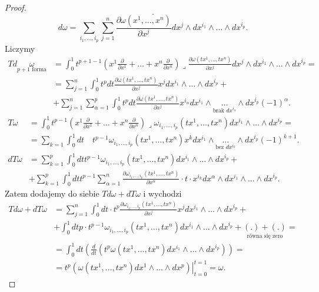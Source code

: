 \documentclass[../main.tex]{subfiles}
\begin{document}
\begin{proof}
\[.\]
\[
    d\omega = \sum_{i_1,\ldots,i_p}\sum_{j=1}^n \frac{\partial \omega(x^1,\ldots,x^n)}{\partial x^j} dx^j\land dx^{i_1}\land \ldots \land dx^{i_p}
.\]
Liczymy
\begin{align*}
    Td\underset{p+1\text{ forma}}{\omega} &= \int_0^1t^{p+1-1}\left( x^1 \frac{\partial }{\partial x^1} + \ldots + x^n \frac{\partial }{\partial x^n}  \right)\lrcorner \frac{\partial \omega(tx^1,\ldots,tx^n)}{\partial x^j} dx^j\land dx^{i_1}\land \ldots\land dx^{i_p} = \\
    &= \sum_{j=1}^n \int_0^1 t^p dt\frac{\partial \omega(tx^1,\ldots,tx^n)}{\partial x^j}x^jdx^{i_1}\land \ldots\land dx^{i_p} +\\
    &+\sum_{j=1}^n\sum_{\alpha = 1}^p \int_0^1 t^p dt \frac{\partial \omega(tx^1,\ldots,tx^n)}{\partial x^j}x^{i_\alpha}dx^{i_1}\land\underset{\text{brak }dx^{i_\alpha}}{\ldots} \land dx^{i_p}(-1)^{\alpha}
.\end{align*}
\begin{align*}
    T\omega &= \int_0^1 t^{p-1} \left(x^1 \frac{\partial }{\partial x^1} + \ldots + x^n \frac{\partial }{\partial x^n} \right)\lrcorner \omega_{i_1,\ldots,i_p} (tx^1, \ldots, tx^n) dx^{i_1}\land \ldots\land dx^{i_p} = \\
    &= \sum_{k = 1}^{}\int_0^1dt\quad t^{p-1} \omega_{i_1,\ldots,i_p}(tx^1,\ldots,tx^n)x^kdx^{i_1}\land \underset{\text{bez }dx^{i_k}}{\ldots}\land dx^{i_p}(-1)^{k+1}.\\
    dT\omega &= \sum_{k=1}^p \int_0^1 dt t^{p-1} \omega_{i_1,\ldots,i_p}(tx^1,\ldots,tx^n)dx^{i_1}\land \ldots\land dx^{i_p} +\\
    &+\sum_{k=1}^p \int_0^1 dt t^{p-1} \sum_{\alpha = 1}^n \frac{\partial \omega_{i_1,\ldots,i_p}(tx^1,\ldots,tx^n)}{\partial x^\alpha}\cdot t\cdot  x^{i_k}dx^\alpha\land dx^{i_1}\land \ldots\land dx^{i_p}
.\end{align*}
Zatem dodajemy do siebie $Td\omega + dT\omega$ i wychodzi
\begin{align*}
    Td\omega + dT\omega &= \sum_{j = 1}^n\int_0^1dt\cdot t^p \frac{\partial \omega_{i_1,\ldots,i_p}(tx^1,\ldots,tx^n)}{\partial x^j} x^j dx^{i_1}\land \ldots\land dx^{i_p} +\\
    &+ \int_0^1dt p\cdot t^{p-1}\omega_{i_1,\ldots,i_p}(tx^1,\ldots,tx^n)dx^{i_1}\land \ldots\land dx^{i_p} + \underset{\text{równa się zero}}{\left( . \right) + \left( . \right)} = \\
    &= \int_0^1dt\left(\frac{d}{dt}\left( t^p \omega(tx^1,\ldots,tx^n)dx^{i_1}\land \ldots\land dx^{i_p}\right)\right) =\\
    &= t^p\left.\left(\omega(tx^1,\ldots,tx^n)dx^1\land\ldots\land dx^p\right)\right|_{t = 0}^{t = 1} = \omega
.\end{align*}

\end{proof}
\end{document}
